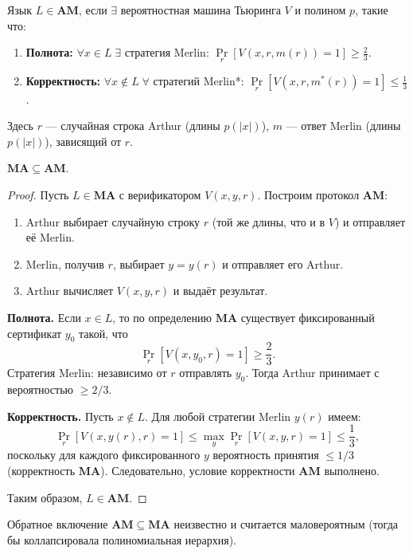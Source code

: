 \begin{definition}
    Язык \(L \in \mathbf{AM}\), если \(\exists\) вероятностная машина Тьюринга \(V\) и полином \(p\), такие что:
    \begin{enumerate}
        \item \textbf{Полнота:} \(\forall x \in L \; \exists\) стратегия Merlin: \(\Pr\limits_{r}[V(x, r, m(r)) = 1] \ge \frac{2}{3}\).
        \item \textbf{Корректность:} \(\forall x \notin L \; \forall\) стратегий Merlin*: \(\Pr\limits_{r}[V(x, r, m^*(r)) = 1] \le \frac{1}{3}\).
    \end{enumerate}
    Здесь \(r\) — случайная строка Arthur (длины \(p(|x|)\)), \(m\) — ответ Merlin (длины \(p(|x|)\)), зависящий от \(r\).
\end{definition}

\begin{theorem}
    \(\mathbf{MA} \subseteq \mathbf{AM}\).
\end{theorem}
\begin{proof}
    Пусть \(L \in \mathbf{MA}\) с верификатором \(V(x,y,r)\). Построим протокол \(\mathbf{AM}\):
    \begin{enumerate}
        \item Arthur выбирает случайную строку \(r\) (той же длины, что и в \(V\)) и отправляет её Merlin.
        \item Merlin, получив \(r\), выбирает \(y = y(r)\) и отправляет его Arthur.
        \item Arthur вычисляет \(V(x, y, r)\) и выдаёт результат.
    \end{enumerate}

    \textbf{Полнота.} Если \(x \in L\), то по определению \(\mathbf{MA}\) существует фиксированный сертификат \(y_0\) такой, что
    \[
    \Pr_{r}[V(x, y_0, r) = 1] \ge \frac{2}{3}.
    \]
    Стратегия Merlin: независимо от \(r\) отправлять \(y_0\). Тогда Arthur принимает с вероятностью \(\ge 2/3\).

    \textbf{Корректность.} Пусть \(x \notin L\). Для любой стратегии Merlin \(y(r)\) имеем:
    \[
    \Pr_{r}[V(x, y(r), r) = 1] \le \max_{y} \Pr_{r}[V(x, y, r) = 1] \le \frac{1}{3},
    \]
    поскольку для каждого фиксированного \(y\) вероятность принятия \(\le 1/3\) (корректность \(\mathbf{MA}\)). Следовательно, условие корректности \(\mathbf{AM}\) выполнено.

    Таким образом, \(L \in \mathbf{AM}\).
\end{proof}

\begin{note}
    Обратное включение \(\mathbf{AM} \subseteq \mathbf{MA}\) неизвестно и считается маловероятным (тогда бы коллапсировала полиномиальная иерархия).
\end{note}